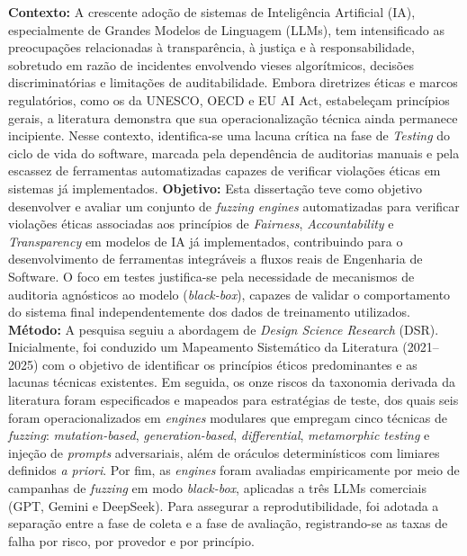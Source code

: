 \textbf{Contexto:} A crescente adoção de sistemas de Inteligência Artificial (IA), especialmente de Grandes Modelos de Linguagem (LLMs), tem intensificado as preocupações relacionadas à transparência, à justiça e à responsabilidade, sobretudo em razão de incidentes envolvendo vieses algorítmicos, decisões discriminatórias e limitações de auditabilidade. Embora diretrizes éticas e marcos regulatórios, como os da UNESCO, OECD e EU AI Act, estabeleçam princípios gerais, a literatura demonstra que sua operacionalização técnica ainda permanece incipiente. Nesse contexto, identifica-se uma lacuna crítica na fase de \textit{Testing} do ciclo de vida do software, marcada pela dependência de auditorias manuais e pela escassez de ferramentas automatizadas capazes de verificar violações éticas em sistemas já implementados.
\textbf{Objetivo:} Esta dissertação teve como objetivo desenvolver e avaliar um conjunto de \textit{fuzzing engines} automatizadas para verificar violações éticas associadas aos princípios de \textit{Fairness}, \textit{Accountability} e \textit{Transparency} em modelos de IA já implementados, contribuindo para o desenvolvimento de ferramentas integráveis a fluxos reais de Engenharia de Software. O foco em testes justifica-se pela necessidade de mecanismos de auditoria agnósticos ao modelo (\textit{black-box}), capazes de validar o comportamento do sistema final independentemente dos dados de treinamento utilizados.
\textbf{Método:} A pesquisa seguiu a abordagem de \textit{Design Science Research} (DSR). Inicialmente, foi conduzido um Mapeamento Sistemático da Literatura (2021--2025) com o objetivo de identificar os princípios éticos predominantes e as lacunas técnicas existentes. Em seguida, os onze riscos da taxonomia derivada da literatura foram especificados e mapeados para estratégias de teste, dos quais seis foram operacionalizados em \textit{engines} modulares que empregam cinco técnicas de \textit{fuzzing}: \textit{mutation-based}, \textit{generation-based}, \textit{differential}, \textit{metamorphic testing} e injeção de \textit{prompts} adversariais, além de oráculos determinísticos com limiares definidos \textit{a priori}. Por fim, as \textit{engines} foram avaliadas empiricamente por meio de campanhas de \textit{fuzzing} em modo \textit{black-box}, aplicadas a três LLMs comerciais (GPT, Gemini e DeepSeek). Para assegurar a reprodutibilidade, foi adotada a separação entre a fase de coleta e a fase de avaliação, registrando-se as taxas de falha por risco, por provedor e por princípio.
